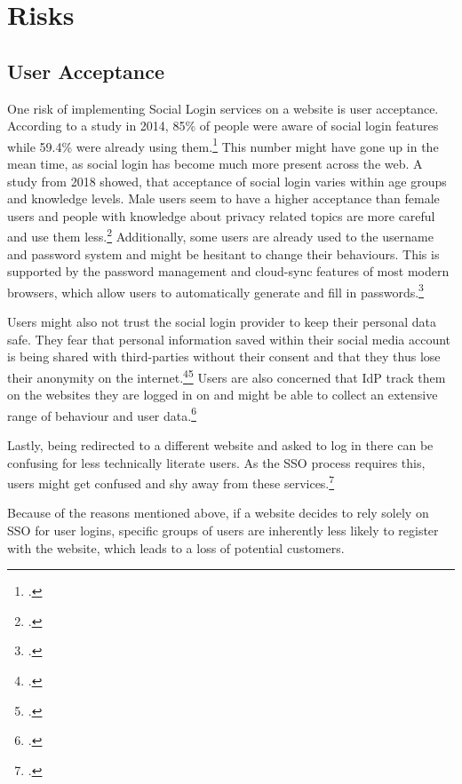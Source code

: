 \newpage

\section{Risks}
\label{sec:risks}

\subsection{User Acceptance}

One risk of implementing Social Login services on a website is user acceptance.
According to a study in 2014, 85\% of people were aware of social login features while 59.4\% were already
using them.\footcite[Cp. ][p. 68]{Gafni2014}
This number might have gone up in the mean time, as social login has become much more present across the web.
A study from 2018 showed, that acceptance of social login varies within age groups and knowledge levels.
Male users seem to have a higher acceptance than female users and people with knowledge about privacy related topics
are more careful and use them less.\footcite[Cp.][p. 7]{Jiang2018}
Additionally, some users are already used to the username and password system and
might be hesitant to change their behaviours. This is supported by the password management and cloud-sync features
of most modern browsers, which allow users to automatically generate and fill in passwords.\footcite[Cp.][p. 22]{Bazaz2016}

Users might also not trust the social login provider to keep their personal data safe.
They fear that personal information saved within their social media account is being shared with third-parties without
their consent and that they thus lose their anonymity on the internet.\footcite[Cp.][p. 22]{Bazaz2016}\footcite[Cp.][p.61]{Gafni2014}
Users are also concerned that \ac{IdP} track them on the websites they are logged in on and might be able to collect
an extensive range of behaviour and user data.\footcite[Cp.][p. 60]{Gafni2014}

Lastly, being redirected to a different website and asked to log in there can be confusing for less technically literate
users. As the \ac{SSO} process requires this, users might get confused and shy away from these services.\footcite[Cp.][p. 23]{Bazaz2016}

Because of the reasons mentioned above, if a website decides to rely solely on \ac{SSO} for user logins,
specific groups of users are inherently less likely to register with the website, which leads to a loss of potential customers.


